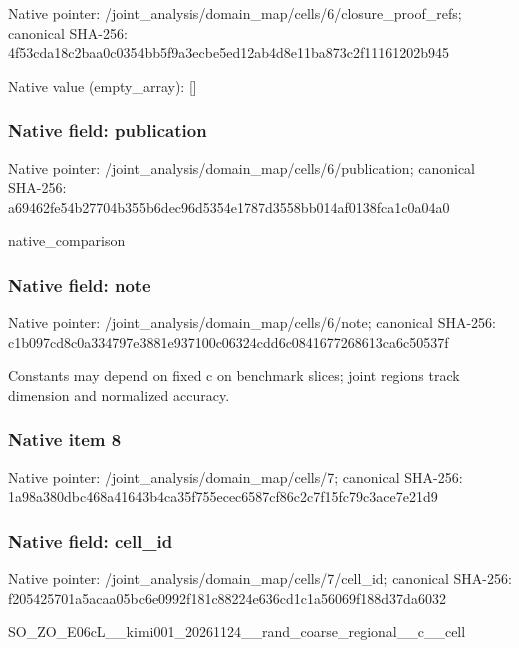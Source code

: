 \documentclass[10pt,a4paper]{article}
\begin{document}
Native pointer: /joint\_analysis/domain\_m\allowbreak{}ap/cells/6/closure\_proof\allowbreak{}\_refs; canonical SHA-256: 4f53cda18c2baa0c0354bb5f\allowbreak{}9a3ecbe5ed12ab4d8e11ba87\allowbreak{}3c2f11161202b945



Native value (empty\_array): []



\subsubsection{Native field: publication}


Native pointer: /joint\_analysis/domain\_m\allowbreak{}ap/cells/6/publication; canonical SHA-256: a69462fe54b27704b355b6de\allowbreak{}c96d5354e1787d3558bb014a\allowbreak{}f0138fca1c0a04a0


native\_comparison


\subsubsection{Native field: note}


Native pointer: /joint\_analysis/domain\_map/cells/6/note; canonical SHA-256: c1b097cd8c0a334797e3881e\allowbreak{}937100c06324cdd6c0841677\allowbreak{}268613ca6c50537f


Constants may depend on fixed c on benchmark slices; joint regions track dimension and normalized accuracy.


\subsubsection{Native item 8}


Native pointer: /joint\_analysis/domain\_map/cells/7; canonical SHA-256: 1a98a380dbc468a41643b4ca\allowbreak{}35f755ecec6587cf86c2c7f1\allowbreak{}5fc79c3ace7e21d9



\subsubsection{Native field: cell\_id}


Native pointer: /joint\_analysis/domain\_m\allowbreak{}ap/cells/7/cell\_id; canonical SHA-256: f205425701a5acaa05bc6e09\allowbreak{}92f181c88224e636cd1c1a56\allowbreak{}069f188d37da6032


SO\_ZO\_E06cL\_\_kimi001\_202\allowbreak{}61124\_\_rand\_coarse\_regio\allowbreak{}nal\_\_c\_\_cell
\end{document}
